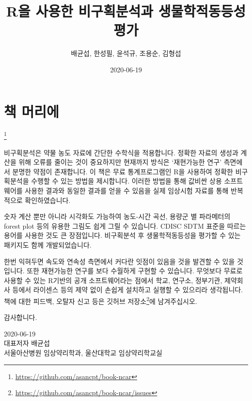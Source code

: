 \documentclass[
  10pt,
]{krantz}
\title{R을 사용한 비구획분석과 생물학적동등성 평가}
\author{배균섭, 한성필, 윤석규, 조용순, 김형섭}
\date{2020-06-19}
\renewcommand{\href}[2]{#2\footnote{\url{#1}}}
\begin{document}
\maketitle

\thispagestyle{empty}
\begin{center}
\end{center}

\setlength{\abovedisplayskip}{-5pt}
\setlength{\abovedisplayshortskip}{-5pt}

{
\hypersetup{linkcolor=}
\setcounter{tocdepth}{2}
\tableofcontents
}
\hypertarget{uxcc45-uxba38uxb9acuxc5d0}{%
\chapter*{책 머리에}\label{uxcc45-uxba38uxb9acuxc5d0}}


\href{https://github.com/asancpt/book-ncar}{}

비구획분석은 약물 농도 자료에 간단한 수학식을 적용합니다. 정확한 자료의 생성과 계산을 위해 오류를 줄이는 것이 중요하지만 현재까지 방식은 `재현가능한 연구' 측면에서 분명한 약점이 존재합니다. 이 책은 무료 통계프로그램인 R을 사용하여 정확한 비구획분석을 수행할 수 있는 방법을 제시합니다.
이러한 방법을 통해 값비싼 상용 소프트웨어를 사용한 결과와 동일한 결과를 얻을 수 있음을 실제 임상시험 자료를 통해 반복적으로 확인하였습니다.

숫자 계산 뿐만 아니라 시각화도 가능하여 농도-시간 곡선, 용량군 별 파라메터의 forest plot 등의 유용한 그림도 쉽게 그릴 수 있습니다.
CDISC SDTM 표준을 따르는 용어를 사용한 것도 큰 장점입니다.
비구획분석 후 생물학적동등성을 평가할 수 있는 패키지도 함께 개발되었습니다.

한번 익혀두면 속도와 연속성 측면에서 커다란 잇점이 있음을 것을 발견할 수 있을 것입니다.
또한 재현가능한 연구를 보다 수월하게 구현할 수 있습니다.
무엇보다 무료로 사용할 수 있는 R기반의 공개 소프트웨어라는 점에서 학교, 연구소, 정부기관, 제약회사 등에서 라이센스 등의 제약 없이 손쉽게 설치하고 실행할 수 있으리라 생각됩니다.
책에 대한 피드백, 오탈자 신고 등은 \href{https://github.com/asancpt/book-ncar/issues}{깃허브 저장소}에 남겨주십시오.

감사합니다.

2020-06-19\\
대표저자 배균섭\\
서울아산병원 임상약리학과, 울산대학교 임상약리학교실
\end{document}
